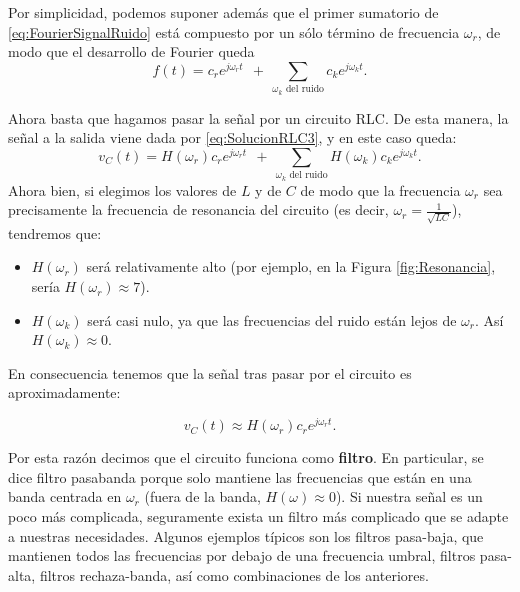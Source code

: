 Por simplicidad, podemos suponer además que el primer sumatorio de \eqref{eq:FourierSignalRuido} está compuesto por un sólo término de frecuencia $\omega_r$, de modo que el desarrollo de Fourier queda
\begin{equation}
  \label{eq:FourierSignalRuido}
  f(t) = c_r e^{j\omega_r t}\ \ +\  \sum_{\omega_k\text{ del ruido}}\!\!\!\!\!c_k e^{j\omega_k t}.
\end{equation}

Ahora basta que hagamos pasar la señal por un circuito RLC. De esta manera, la señal a la salida viene dada por \eqref{eq:SolucionRLC3}, y en este caso queda:
\begin{equation}
  \label{eq:FourierSignalFiltrada1}
  v_C(t) = H(\omega_r) c_r e^{j\omega_r t}\ \ +\  \sum_{\omega_k\text{ del ruido}}\!\!\!\!\! H(\omega_k)c_k e^{j\omega_k t}.
\end{equation}
 Ahora bien, si elegimos los valores de $L$ y de $C$ de modo que la frecuencia $\omega_r$ sea precisamente la frecuencia de resonancia del circuito (es decir, $\omega_r = \frac{1}{\sqrt{LC}}$), tendremos que:
 \begin{itemize}
 \item $H(\omega_r)$ será relativamente alto (por ejemplo, en la Figura \ref{fig:Resonancia}, sería $H(\omega_r)\approx 7$).
 \item $H(\omega_k)$ será casi nulo, ya que las frecuencias del ruido están lejos de $\omega_r$. Así  $H(\omega_k)\approx 0$.
 \end{itemize}
En consecuencia tenemos que la señal tras pasar por el circuito es aproximadamente:
\begin{mybox}\vspace{-15pt}
  \begin{equation}
    \label{eq:FourierSignalFiltrada}
    v_C(t) \approx H(\omega_r) c_r e^{j\omega_r t}.
  \end{equation}
\end{mybox}

Por esta razón decimos que el circuito funciona como \textbf{filtro}. En particular, se dice filtro pasabanda porque solo mantiene las frecuencias que están en una banda centrada en $\omega_r$ (fuera de la banda, $H(\omega)\approx 0$). Si nuestra señal es un poco más complicada, seguramente exista un filtro más complicado que se adapte a nuestras necesidades. Algunos ejemplos típicos son los filtros pasa-baja, que mantienen todos las frecuencias por debajo de una frecuencia umbral, filtros pasa-alta, filtros rechaza-banda, así como combinaciones de los anteriores.





\newpage



